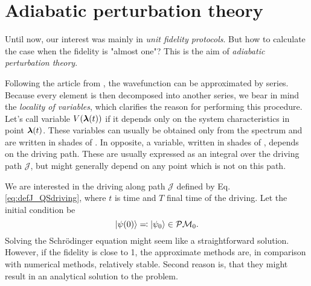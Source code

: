 \section{Adiabatic perturbation theory}
Until now, our interest was mainly in \emph{unit fidelity protocols}. But how to calculate the case when the fidelity is "almost one"? This is the aim of \emph{adiabatic perturbation theory}.


Following the article from \citet{Rigolin2008}, the wavefunction can be approximated by series. Because every element is then decomposed into another series, we bear in mind the \emph{locality of variables}, which clarifies the reason for performing this procedure. Let's call variable $V({\bm\lambda}(t))$ \emph{} if it depends only on the system characteristics in point ${\bm\lambda}(t)$. These variables can usually be obtained only from the spectrum  and are written in shades of . In opposite, a  variable, written in shades of , depends on the driving path. These are usually expressed as an integral over the driving path $\mathcal J$, but might generally depend on any point which is not on this path.

We are interested in the driving along path $\mathcal J$ defined by Eq. \ref{eq:defJ_QSdriving},
where $t$ is time and $T$ final time of the driving. Let the initial condition be
\begin{equation}
    \ket{\psi(0)}\eqqcolon\ket{\psi_0}\in \mathcal{P}\mathcal{M}_0.
\end{equation}
Solving the Schr\"odinger equation might seem like a straightforward solution. However, if the fidelity is close to 1, the approximate methods are, in comparison with numerical methods, relatively stable. Second reason is, that they might result in an analytical solution to the problem.

